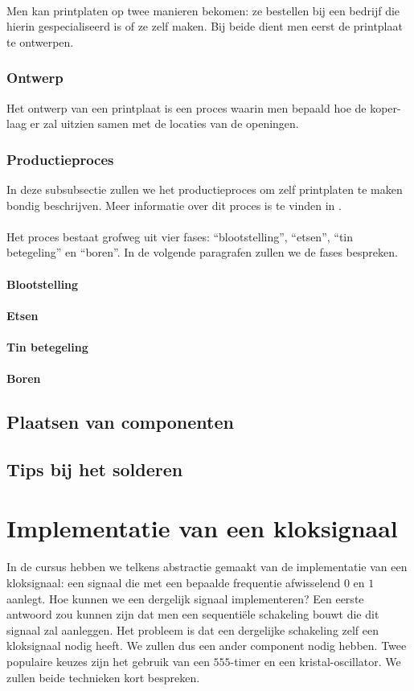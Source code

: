 \paragraph{}
Men kan printplaten op twee manieren bekomen: ze bestellen bij een bedrijf die hierin gespecialiseerd is of ze zelf maken. Bij beide dient men eerst de printplaat te ontwerpen.
\subsubsection{Ontwerp}
Het ontwerp van een printplaat is een proces waarin men bepaald hoe de koper-laag er zal uitzien samen met de locaties van de openingen.
\subsubsection{Productieproces}
In deze subsubsectie zullen we het productieproces om zelf printplaten te maken bondig beschrijven. Meer informatie over dit proces is te vinden in \cite{fabricatingprintedcircuitboards}.
\paragraph{}
Het proces bestaat grofweg uit vier fases: ``blootstelling'', ``etsen'', ``tin betegeling'' en ``boren''\cite[p. 69]{fabricatingprintedcircuitboards}. In de volgende paragrafen zullen we de fases bespreken.
\paragraph{Blootstelling}
\paragraph{Etsen}
\paragraph{Tin betegeling}
\paragraph{Boren}
\subsection{Plaatsen van componenten}
\subsection{Tips bij het solderen}
\section{Implementatie van een kloksignaal}
In de cursus hebben we telkens abstractie gemaakt van de implementatie van een kloksignaal: een signaal die met een bepaalde frequentie afwisselend $0$ en $1$ aanlegt. Hoe kunnen we een dergelijk signaal implementeren? Een eerste antwoord zou kunnen zijn dat men een sequenti\"ele schakeling bouwt die dit signaal zal aanleggen. Het probleem is dat een dergelijke schakeling zelf een kloksignaal nodig heeft. We zullen dus een ander component nodig hebben. Twee populaire keuzes zijn het gebruik van een $555$-timer en een kristal-oscillator. We zullen beide technieken kort bespreken.
